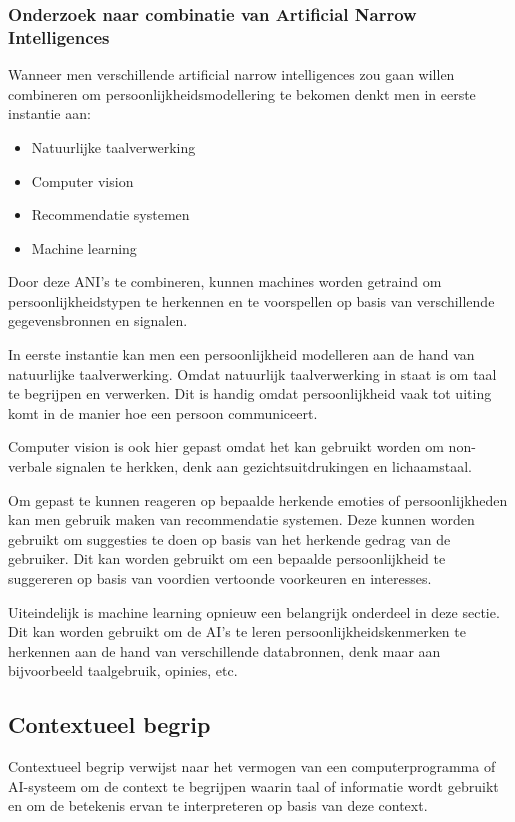 \subsubsection{Onderzoek naar combinatie van Artificial Narrow Intelligences}

Wanneer men verschillende artificial narrow intelligences zou gaan willen combineren om persoonlijkheidsmodellering te bekomen denkt men in eerste instantie aan:

\begin{itemize}
    \item Natuurlijke taalverwerking
    \item Computer vision
    \item Recommendatie systemen
    \item Machine learning
\end{itemize}

Door deze ANI's te combineren, kunnen machines worden getraind om persoonlijkheidstypen te herkennen en te voorspellen op basis van verschillende gegevensbronnen en signalen.

In eerste instantie kan men een persoonlijkheid modelleren aan de hand van natuurlijke taalverwerking. Omdat natuurlijk taalverwerking in staat is om taal te begrijpen en verwerken. Dit is handig omdat persoonlijkheid vaak tot uiting komt in de manier hoe een persoon communiceert.

Computer vision is ook hier gepast omdat het kan gebruikt worden om non-verbale signalen te herkken, denk aan gezichtsuitdrukingen en lichaamstaal.

Om gepast te kunnen reageren op bepaalde herkende emoties of persoonlijkheden kan men gebruik maken van recommendatie systemen. Deze kunnen worden gebruikt om suggesties te doen op basis van het herkende gedrag van de gebruiker. Dit kan worden gebruikt om een bepaalde persoonlijkheid te suggereren op basis van voordien vertoonde voorkeuren en interesses.

Uiteindelijk is machine learning opnieuw een belangrijk onderdeel in deze sectie. Dit kan worden gebruikt om de AI's te leren persoonlijkheidskenmerken te herkennen aan de hand van verschillende databronnen, denk maar aan bijvoorbeeld taalgebruik, opinies, etc.

\subsection{Contextueel begrip}

Contextueel begrip verwijst naar het vermogen van een computerprogramma of AI-systeem om de context te begrijpen waarin taal of informatie wordt gebruikt en om de betekenis ervan te interpreteren op basis van deze context.

